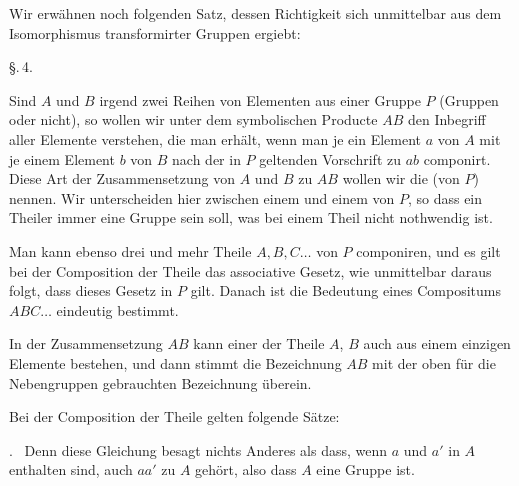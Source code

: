 
Wir erwähnen noch folgenden Satz, dessen Richtigkeit sich unmittelbar aus
dem Isomorphismus transformirter Gruppen ergiebt:


\begin{center}
\S.\,4.

\end{center}

Sind $A$ und $B$ irgend zwei Reihen von Elementen aus einer Gruppe $P$
(Gruppen oder nicht), so wollen wir unter dem symbolischen Producte $AB$
den Inbegriff aller Elemente verstehen, die man erhält, wenn man je ein
Element $a$ von $A$ mit je einem Element $b$ von $B$ nach der in $P$
geltenden Vorschrift zu $ab$ componirt. Diese Art der Zusammensetzung von
$A$ und $B$ zu $AB$ wollen wir die  (von $P$)
nennen. Wir unterscheiden hier zwischen einem  und einem  von
$P$, so dass ein Theiler immer eine Gruppe sein soll, was bei einem Theil
nicht nothwendig ist.

Man kann ebenso drei und mehr Theile $A, B, C \ldots$ von $P$ componiren,
und es gilt bei der Composition der Theile das associative Gesetz, wie
unmittelbar daraus folgt, dass dieses Gesetz in $P$ gilt. Danach ist die
Bedeutung eines Compositums $ABC \ldots$ eindeutig bestimmt.

In der Zusammensetzung $AB$ kann einer der Theile $A$, $B$ auch aus einem
einzigen Elemente bestehen, und dann stimmt die Bezeichnung $AB$ mit der
oben für die Nebengruppen gebrauchten Bezeichnung überein.

Bei der Composition der Theile gelten folgende Sätze:

.\ 
Denn diese Gleichung besagt nichts Anderes als dass, wenn $a$ und $a'$ in
$A$ enthalten sind, auch $aa'$ zu $A$ gehört, also dass $A$ eine Gruppe
ist.
